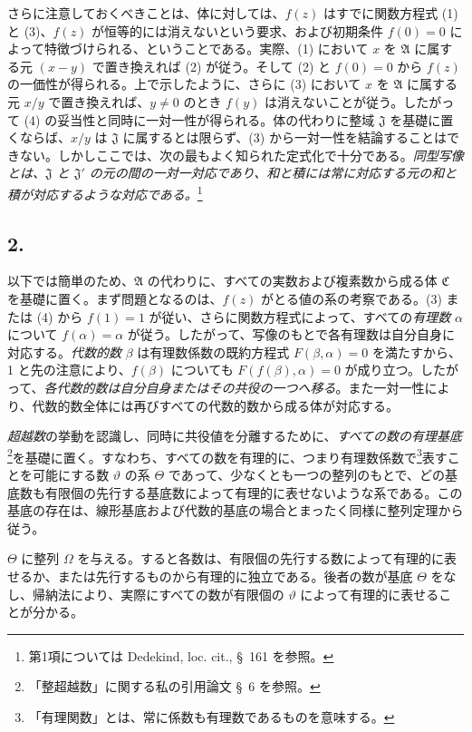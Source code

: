 \documentclass[11pt]{article}
\begin{document}
さらに注意しておくべきことは、体に対しては、$f(z)$ はすでに関数方程式 (1) と (3)、$f(z)$ が恒等的には消えないという要求、および初期条件 $f(0)=0$ によって特徴づけられる、ということである。実際、(1) において $x$ を $\mathfrak A$ に属する元 $(x-y)$ で置き換えれば (2) が従う。そして (2) と $f(0)=0$ から $f(z)$ の一価性が得られる。上で示したように、さらに (3) において $x$ を $\mathfrak A$ に属する元 $x/y$ で置き換えれば、$y\ne0$ のとき $f(y)$ は消えないことが従う。したがって (4) の妥当性と同時に一対一性が得られる。体の代わりに整域 $\mathfrak J$ を基礎に置くならば、$x/y$ は $\mathfrak J$ に属するとは限らず、(3) から一対一性を結論することはできない。しかしここでは、次の最もよく知られた定式化で十分である。\emph{同型写像とは、$\mathfrak J$ と $\mathfrak J'$ の元の間の一対一対応であり、和と積には常に対応する元の和と積が対応するような対応である。}\footnote{第1項については Dedekind, loc. cit., \S\ 161 を参照。}

\subsection*{2.}

以下では簡単のため、$\mathfrak A$ の代わりに、すべての実数および複素数から成る体 $\mathfrak C$ を基礎に置く。まず問題となるのは、$f(z)$ がとる値の系の考察である。(3) または (4) から $f(1)=1$ が従い、さらに関数方程式によって、すべての\emph{有理数} $\alpha$ について $f(\alpha)=\alpha$ が従う。したがって、写像のもとで各有理数は自分自身に対応する。\emph{代数的数} $\beta$ は有理数係数の既約方程式 $F(\beta,\alpha)=0$ を満たすから、1 と先の注意により、$f(\beta)$ についても $F(f(\beta),\alpha)=0$ が成り立つ。したがって、\emph{各代数的数は自分自身またはその共役の一つへ移る}。また一対一性により、代数的数全体には再びすべての代数的数から成る体が対応する。

\emph{超越数}の挙動を認識し、同時に共役値を分離するために、\emph{すべての数の有理基底}\footnote{「整超越数」に関する私の引用論文 \S\ 6 を参照。}を基礎に置く。すなわち、すべての数を有理的に、つまり有理数係数で\footnote{「有理関数」とは、常に係数も有理数であるものを意味する。}表すことを可能にする数 $\vartheta$ の系 $\Theta$ であって、少なくとも一つの整列のもとで、どの基底数も有限個の先行する基底数によって有理的に表せないような系である。この基底の存在は、線形基底および代数的基底の場合とまったく同様に整列定理から従う。

$\Theta$ に整列 $\Omega$ を与える。すると各数は、有限個の先行する数によって有理的に表せるか、または先行するものから有理的に独立である。後者の数が基底 $\Theta$ をなし、帰納法により、実際にすべての数が有限個の $\vartheta$ によって有理的に表せることが分かる。
\end{document}
